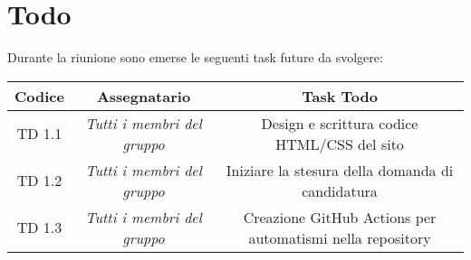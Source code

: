 \section{Todo}

Durante la riunione sono emerse le seguenti task future da svolgere:

\vspace{0.5cm}

\begin{table}[htbp]
	\begin{tabular}{|c|c|c|}
		\hline
		\rowcolor[gray]{0.9}
		Codice & Assegnatario & Task Todo \\
		\hline
		TD 1.1 & \it{Tutti i membri del gruppo} & Design e scrittura codice HTML/CSS del sito\\
		\hline
		TD 1.2 & \it{Tutti i membri del gruppo} & Iniziare la stesura della domanda di candidatura \\
		\hline
		TD 1.3 & \it{Tutti i membri del gruppo} & Creazione GitHub Actions per automatismi nella repository \\
		\hline
	\end{tabular}
\end{table}